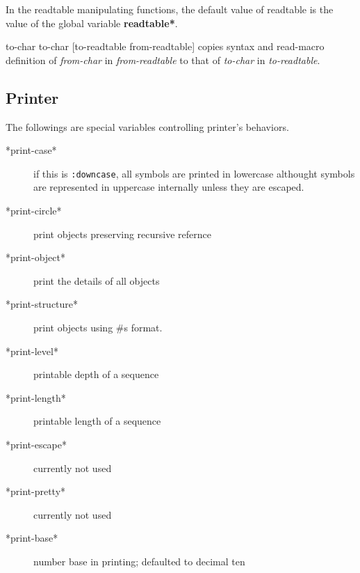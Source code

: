 In the readtable manipulating functions, the default value of readtable
is the value of the global variable {\bf *readtable*}.

\begin{refdesc}


{to-char to-char [to-readtable from-readtable]}
{copies syntax and read-macro definition of {\em from-char} in
{\em from-readtable} to that of {\em to-char} in {\em to-readtable}.}

\end{refdesc}

%
%

\newpage

\subsection{Printer}

The followings are special variables controlling printer's behaviors.

\begin{description}

\item[*print-case*] if this is {\tt :downcase},
all symbols are printed in lowercase
althought symbols are represented in uppercase
internally unless they are escaped.
\item[*print-circle*] print objects preserving recursive refernce
\item[*print-object*] print the details of all objects
\item[*print-structure*] print objects using \#s format.
\item[*print-level*] printable depth of a sequence
\item[*print-length*] printable length of a sequence
\item[*print-escape*] currently not used
\item[*print-pretty*] currently not used
\item[*print-base*] number base in printing; defaulted to decimal ten
\end{description}

